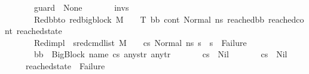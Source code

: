 \begin{isabellebody}
\ \ \ \ \ \ \ {\isachardoublequoteopen}guard\ {\isacharequal}{\kern0pt}\ None{\isachardoublequoteclose}\isanewline
\ \ \ \ \ \ \ {\isachardoublequoteopen}invs\ {\isacharequal}{\kern0pt}\ {\isacharbrackleft}{\kern0pt}{\isacharbrackright}{\kern0pt}{\isachardoublequoteclose}\isanewline
\ \ \ \ \ \ \ Red{\isacharunderscore}{\kern0pt}bb{\isacharunderscore}{\kern0pt}to{\isacharcolon}{\kern0pt}\ {\isachardoublequoteopen}red{\isacharunderscore}{\kern0pt}bigblock\ M\ {\isasymLambda}\ {\isasymGamma}\ {\isasymOmega}\ T\ {\isacharparenleft}{\kern0pt}bb{\isacharcomma}{\kern0pt}\ cont{}{\isacharcomma}{\kern0pt}\ {\isacharparenleft}{\kern0pt}Normal\ ns{}{\isacharparenright}{\kern0pt}{\isacharparenright}{\kern0pt}\ {\isacharparenleft}{\kern0pt}reached{\isacharunderscore}{\kern0pt}bb{\isacharcomma}{\kern0pt}\ reached{\isacharunderscore}{\kern0pt}cont{\isacharcomma}{\kern0pt}\ reached{\isacharunderscore}{\kern0pt}state{\isacharparenright}{\kern0pt}{\isachardoublequoteclose}\ \isanewline
\ \ \ \ \ \ \ Red{\isacharunderscore}{\kern0pt}impl{\isacharcolon}{\kern0pt}\ {\isachardoublequoteopen}{\isacharparenleft}{\kern0pt}{\isasymAnd}\ s{}{\isacharprime}{\kern0pt}{\isachardot}{\kern0pt}{\isacharparenleft}{\kern0pt}{\isacharparenleft}{\kern0pt}red{\isacharunderscore}{\kern0pt}cmd{\isacharunderscore}{\kern0pt}list\ M\ {\isasymLambda}\ {\isasymGamma}\ {\isasymOmega}\ cs{}\ {\isacharparenleft}{\kern0pt}Normal\ ns{}{\isacharparenright}{\kern0pt}\ s{}{\isacharprime}{\kern0pt}{\isacharparenright}{\kern0pt}\ {\isasymLongrightarrow}\ {\isacharparenleft}{\kern0pt}s{}{\isacharprime}{\kern0pt}\ {\isasymnoteq}\ Failure{\isacharparenright}{\kern0pt}{\isacharparenright}{\kern0pt}{\isacharparenright}{\kern0pt}{\isachardoublequoteclose}\isanewline
\ \ \ \ \ \ \ {\isachardoublequoteopen}bb\ {\isacharequal}{\kern0pt}\ {\isacharparenleft}{\kern0pt}BigBlock\ name\ cs{}\ any{\isacharunderscore}{\kern0pt}str\ any{\isacharunderscore}{\kern0pt}tr{\isacharparenright}{\kern0pt}{\isachardoublequoteclose}\isanewline
\ \ \ \ \ \ \ {\isachardoublequoteopen}cs{}\ {\isasymnoteq}\ Nil{\isachardoublequoteclose}\isanewline
\ \ \ \ \ \ \ {\isachardoublequoteopen}cs{}\ {\isasymnoteq}\ Nil{\isachardoublequoteclose}\isanewline
\ \ \ \ \ {\isachardoublequoteopen}reached{\isacharunderscore}{\kern0pt}state\ {\isasymnoteq}\ Failure\ \ {\isasymand}\isanewline

\end{isabellebody}
